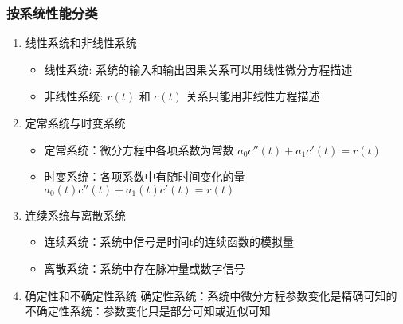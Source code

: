\documentclass{article}
\begin{document}
\begin{frame}
\frametitle{按系统性能分类}
\label{sec-2-1-6}

\begin{enumerate}
\item <2->线性系统和非线性系统
\begin{itemize}
\item 线性系统: 系统的输入和输出因果关系可以用线性微分方程描述
\item 非线性系统: $r(t)$ 和 $c(t)$ 关系只能用非线性方程描述
\end{itemize}
\item <3->定常系统与时变系统
\begin{itemize}
\item 定常系统：微分方程中各项系数为常数 $a_0c''(t)+a_1c'(t)=r(t)$
\item 时变系统：各项系数中有随时间变化的量 $a_0(t)c''(t)+a_1(t)c'(t)=r(t)$
\end{itemize}
\item <4->连续系统与离散系统
\begin{itemize}
\item 连续系统：系统中信号是时间t的连续函数的模拟量
\item 离散系统：系统中存在脉冲量或数字信号
\end{itemize}
\item <5->确定性和不确定性系统
    确定性系统：系统中微分方程参数变化是精确可知的
    不确定性系统：参数变化只是部分可知或近似可知
\end{enumerate}
\end{frame}
\end{document}

